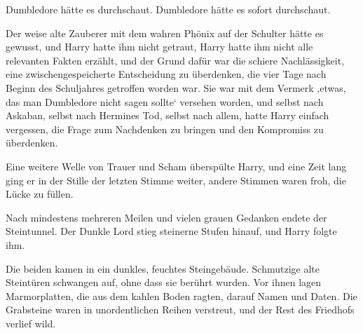 Dumbledore hätte es durchschaut. Dumbledore hätte es sofort durchschaut.

Der weise alte Zauberer mit dem wahren Phönix auf der Schulter hätte es gewusst, und Harry hatte ihm nicht getraut, Harry hatte ihm nicht alle relevanten Fakten erzählt, und der Grund dafür war die schiere Nachlässigkeit, eine zwischengespeicherte Entscheidung zu überdenken, die vier Tage nach Beginn des Schuljahres getroffen worden war. Sie war mit dem Vermerk ‚etwas, das man Dumbledore nicht sagen sollte‘ versehen worden, und selbst nach Askaban, selbst nach Hermines Tod, selbst nach allem, hatte Harry einfach vergessen, die Frage zum Nachdenken zu bringen und den Kompromiss zu überdenken.

Eine weitere Welle von Trauer und Scham überspülte Harry, und eine Zeit lang ging er in der Stille der letzten Stimme weiter, andere Stimmen waren froh, die Lücke zu füllen.

Nach mindestens mehreren Meilen und vielen grauen Gedanken endete der Steintunnel.
Der Dunkle Lord stieg steinerne Stufen hinauf, und Harry folgte ihm.

Die beiden kamen in ein dunkles, feuchtes Steingebäude. Schmutzige alte Steintüren schwangen auf, ohne dass sie berührt wurden.
Vor ihnen lagen Marmorplatten, die aus dem kahlen Boden ragten, darauf Namen und Daten. Die Grabsteine waren in unordentlichen Reihen verstreut, und der Rest des Friedhofs verlief wild.

